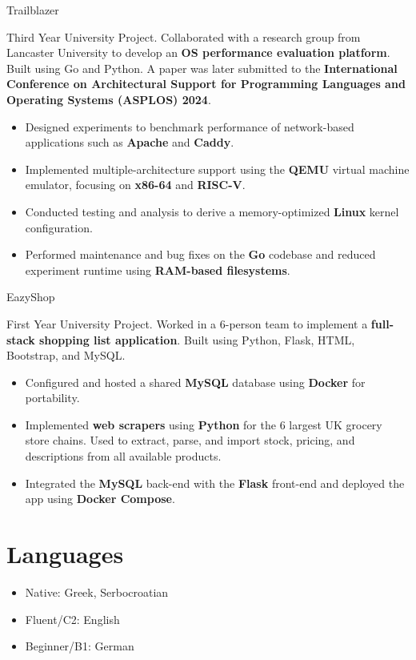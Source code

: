 \documentclass[]{prometheus_cv}
\begin{document}
{}
{Trailblazer}
{
    Third Year University Project. Collaborated with a research group from Lancaster University to develop an \textbf{OS performance evaluation platform}. Built using Go and Python. A paper was later submitted to the \textbf{International Conference on Architectural Support for Programming Languages and Operating Systems (ASPLOS) 2024}.
    \begin{itemize}
        \item Designed experiments to benchmark performance of network-based applications such as \textbf{Apache} and \textbf{Caddy}.
        \item Implemented multiple-architecture support using the \textbf{QEMU} virtual machine emulator, focusing on \textbf{x86-64} and \textbf{RISC-V}.
        \item Conducted testing and analysis to derive a memory-optimized \textbf{Linux} kernel configuration.
        \item Performed maintenance and bug fixes on the \textbf{Go} codebase and reduced experiment runtime using \textbf{RAM-based filesystems}.
    \end{itemize}
}

{}
{EazyShop}
{
    First Year University Project. Worked in a 6-person team to implement a \textbf{full-stack shopping list application}. Built using Python, Flask, HTML, Bootstrap, and MySQL.
    \begin{itemize}
        \item Configured and hosted a shared \textbf{MySQL} database using \textbf{Docker} for portability.
        \item Implemented \textbf{web scrapers} using \textbf{Python} for the 6 largest UK grocery store chains. Used to extract, parse, and import stock, pricing, and descriptions from all available products.
        \item Integrated the \textbf{MySQL} back-end with the \textbf{Flask} front-end and deployed the app using \textbf{Docker Compose}.
    \end{itemize}
}

\section{Languages}
\begin{itemize}
    \item Native: Greek, Serbocroatian
    \item Fluent/C2: English
    \item Beginner/B1: German
\end{itemize}
\end{document}
